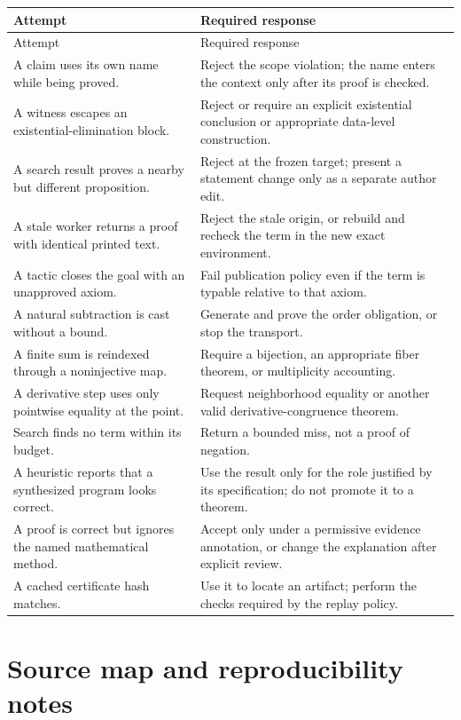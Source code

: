 \documentclass[11pt,a4paper]{article}
\theoremstyle{remark}
\begin{document}
\small
\begin{longtable}{@{}p{}p{}@{}}
\toprule
Attempt & Required response \\
\midrule
\endfirsthead
\toprule Attempt & Required response \\
\midrule
\endhead
A claim uses its own name while being proved. & Reject the scope violation; the name enters the context only after its proof is checked. \\
A witness escapes an existential-elimination block. & Reject or require an explicit existential conclusion or appropriate data-level construction. \\
A search result proves a nearby but different proposition. & Reject at the frozen target; present a statement change only as a separate author edit. \\
A stale worker returns a proof with identical printed text. & Reject the stale origin, or rebuild and recheck the term in the new exact environment. \\
A tactic closes the goal with an unapproved axiom. & Fail publication policy even if the term is typable relative to that axiom. \\
A natural subtraction is cast without a bound. & Generate and prove the order obligation, or stop the transport. \\
A finite sum is reindexed through a noninjective map. & Require a bijection, an appropriate fiber theorem, or multiplicity accounting. \\
A derivative step uses only pointwise equality at the point. & Request neighborhood equality or another valid derivative-congruence theorem. \\
Search finds no term within its budget. & Return a bounded miss, not a proof of negation. \\
A heuristic reports that a synthesized program looks correct. & Use the result only for the role justified by its specification; do not promote it to a theorem. \\
A proof is correct but ignores the named mathematical method. & Accept only under a permissive evidence annotation, or change the explanation after explicit review. \\
A cached certificate hash matches. & Use it to locate an artifact; perform the checks required by the replay policy. \\
\bottomrule
\end{longtable}
\normalsize

\section{Source map and reproducibility notes}\label{app:sources}
\end{document}
